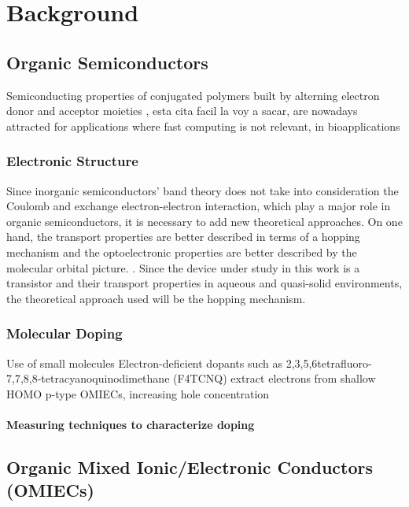 {\chapter{Background}}
\label{sec:background}

\section{Organic Semiconductors}

Semiconducting properties of conjugated polymers built by alterning electron donor and acceptor moieties \cite{matt_electronic_2021}, esta cita facil la voy a sacar, are nowadays attracted for applications where fast computing is not relevant, in bioapplications


\subsection{Electronic Structure}

Since inorganic semiconductors' band theory does not take into consideration the Coulomb and exchange electron-electron interaction, which play a major role in organic semiconductors, it is necessary to add new theoretical approaches. On one hand, the transport properties are better described in terms of a hopping mechanism and the optoelectronic properties are better described by the molecular orbital picture. \cite{alcacer_electronic_2018}. Since the device under study in this work is a transistor and their transport properties in aqueous and quasi-solid environments, the theoretical approach used will be the hopping mechanism.

\subsection{Molecular Doping}

Use of small molecules
Electron-deficient dopants such as 2,3,5,6tetrafluoro-7,7,8,8-tetracyanoquinodimethane (F4TCNQ) extract electrons from shallow HOMO p-type OMIECs, increasing hole concentration \cite{tan_organic_2022}

\subsubsection{Measuring techniques to characterize doping}

\section{Organic Mixed Ionic/Electronic Conductors (OMIECs)}

